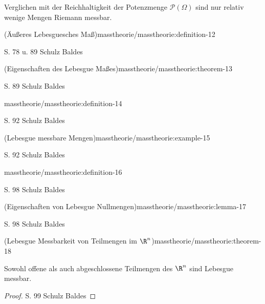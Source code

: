 \par
Verglichen mit der Reichhaltigkeit der Potenzmenge \(\mathcal{P}(\Omega)\) sind nur relativ wenige Mengen Riemann messbar.
\begin{definition}{(Äußeres Lebesguesches Maß)}{masstheorie/masstheorie:definition-12}



\par
S. 78 u. 89 Schulz Baldes
\end{definition}
\begin{theorem}{(Eigenschaften des Lebesgue Maßes)}{masstheorie/masstheorie:theorem-13}



\par
S. 89 Schulz Baldes
\end{theorem}
\begin{definition}{}{masstheorie/masstheorie:definition-14}



\par
S. 92 Schulz Baldes
\end{definition}
\begin{example}{(Lebesgue messbare Mengen)}{masstheorie/masstheorie:example-15}



\par
S. 92 Schulz Baldes
\end{example}
\begin{definition}{}{masstheorie/masstheorie:definition-16}



\par
S. 98 Schulz Baldes
\end{definition}
\begin{lemma}{(Eigenschaften von Lebesgue Nullmengen)}{masstheorie/masstheorie:lemma-17}



\par
S. 98 Schulz Baldes
\end{lemma}
\begin{theorem}{(Lebesgue Messbarkeit von Teilmengen im \protect\(\R^n\protect\))}{masstheorie/masstheorie:theorem-18}



\par
Sowohl offene als auch abgeschlossene Teilmengen des \(\R^n\) sind Lebesgue messbar.
\end{theorem}

\begin{proof}
 S. 99 Schulz Baldes
\end{proof}


